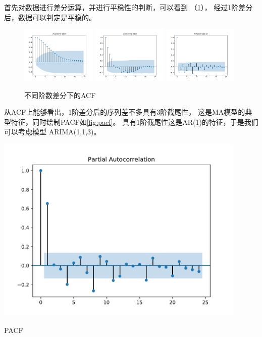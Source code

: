 \documentclass[cn]{homework}
\begin{document}
    \problem
    \begin{subproblem}[(\alph*)]
        \item
        首先对数据进行差分运算，并进行平稳性的判断，可以看到
        （\cref{fig:acf}），
        经过1阶差分后，数据可以判定是平稳的。
        \begin{figure}[h]
            \centering
            \includegraphics[width=0.32\textwidth]{acf-d0}
            \includegraphics[width=0.32\textwidth]{acf-d1}
            \includegraphics[width=0.32\textwidth]{acf-d2}
            \caption{不同阶数差分下的ACF}
            \label{fig:acf}
        \end{figure}

        从ACF上能够看出，1阶差分后的序列差不多具有3阶截尾性，
        这是MA模型的典型特征，同时绘制PACF如\cref{fig:pacf}。
        具有1阶截尾性这是AR(1)的特征，于是我们可以考虑模型
        ARIMA(1,1,3)。
        \begin{marginfigure}
            \includegraphics[width=0.9\textwidth]{pacf}
            \caption{PACF}
            \label{fig:pacf}
        \end{marginfigure}


\end{subproblem}
\end{document}
